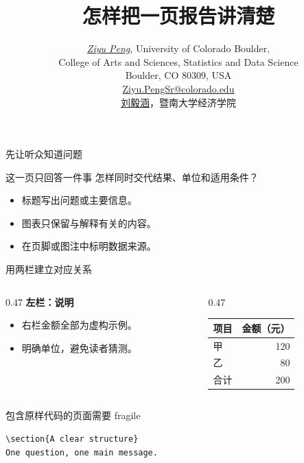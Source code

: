 \documentclass[aspectratio=169]{beamer}
\title{怎样把一页报告讲清楚}
\author[Ziyu Peng, 刘毅涵]{\href{https://github.com/pzy54154631-hub}{\textit{Ziyu Peng}}, University of Colorado Boulder,
  \texorpdfstring{\\[0.1em]}{ }College of Arts and Sciences, Statistics and Data Science
  \texorpdfstring{\\[0.1em]}{ }Boulder, CO 80309, USA
  \texorpdfstring{\\[0.1em]}{ }\href{mailto:Ziyu.PengSr@colorado.edu}{Ziyu.PengSr@colorado.edu}
  \texorpdfstring{\\[0.35em]}{; }
  \href{https://pzy54154631-hub.github.io/liuyihan/}{刘毅涵}，暨南大学经济学院}
\institute{LaTeX 学习手记 · 教学示例}
\date{}
\begin{document}
\begin{frame}
  \titlepage
\end{frame}
\begin{frame}{先让听众知道问题}
  \begin{block}{这一页只回答一件事}
    怎样同时交代结果、单位和适用条件？
  \end{block}
  \begin{itemize}
    \item 标题写出问题或主要信息。
    \item 图表只保留与解释有关的内容。
    \item 在页脚或图注中标明数据来源。
  \end{itemize}
\end{frame}
\begin{frame}{用两栏建立对应关系}
  \begin{columns}[T,onlytextwidth]
    \begin{column}{0.47\textwidth}
      \textbf{左栏：说明}
      \begin{itemize}
        \item 右栏金额全部为虚构示例。
        \item 明确单位，避免读者猜测。
      \end{itemize}
    \end{column}
    \begin{column}{0.47\textwidth}
      \begin{tabular}{lr}
        \toprule 项目 & 金额（元）\\\midrule
        甲 & 120\\ 乙 & 80\\ 合计 & 200\\\bottomrule
      \end{tabular}
    \end{column}
  \end{columns}
\end{frame}
\begin{frame}[fragile]{包含原样代码的页面需要 fragile}
\begin{verbatim}
\section{A clear structure}
One question, one main message.
\end{verbatim}
\end{frame}
\end{document}
